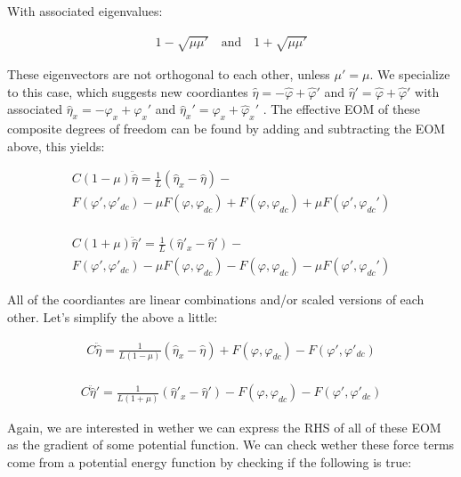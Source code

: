\documentclass[paper=a4, twocolumn, fontsize=10pt]{article} %
\numberwithin{equation}{section} %
\numberwithin{figure}{section} %
\numberwithin{table}{section} %
\def \df#1{\hat{#1}}
\def \dl#1{#1}
\begin{document}
 With associated eigenvalues:
 
 \begin{align} 1-\sqrt{\mu\mu'} \quad \text{and} \quad 1+\sqrt{\mu\mu'} \end{align} 
 
 
 
 These eigenvectors are not orthogonal to each other, unless $\mu'=\mu$. We specialize to this case, which suggests new coordiantes $\df\eta = -\df\varphi + \df\varphi'$ and $\df\eta' = \df\varphi+\df\varphi'$ with associated $\dl\df\eta_x = -\dl\varphi_x + \dl\varphi_x'$ and $\df\eta_x' = \df\varphi_x + \df\varphi_x'$ . The effective EOM of these composite degrees of freedom can be found by adding and subtracting the EOM above, this yields:

\begin{multline}
    C(1-\mu) \ddot{\df\eta} = \frac{1}{L} (\df\eta_x-\df\eta) - \\ F(\dl\varphi', \dl\varphi'_{dc}) - \mu F(\dl\varphi,\dl\varphi_{dc}) + F(\dl\varphi, \dl\varphi_{dc}) + \mu F(\dl\varphi',\dl\varphi_{dc}')
\end{multline}
    \\
\begin{multline}
    C(1+\mu) \ddot{\df\eta}' = \frac{1}{L} (\df\eta'_x-\df\eta') - \\ F(\dl\varphi', \dl\varphi'_{dc}) - \mu F(\dl\varphi,\dl\varphi_{dc}) - F(\dl\varphi, \dl\varphi_{dc}) - \mu F(\dl\varphi',\dl\varphi_{dc}')
\end{multline}

All of the coordiantes are linear combinations and/or scaled versions of each other. Let's simplify the above a little: 

\begin{multline}
    C \ddot{\df\eta} = \frac{1}{L(1-\mu)} (\df\eta_x-\df\eta) + F(\dl\varphi, \dl\varphi_{dc}) - F(\dl\varphi', \dl\varphi'_{dc})
\end{multline}
    \\
\begin{multline}
    C \ddot{\df\eta}' = \frac{1}{L(1+\mu)} (\df\eta'_x-\df\eta') - F(\dl\varphi, \dl\varphi_{dc}) - F(\dl\varphi', \dl\varphi'_{dc})
\end{multline}

Again, we are interested in wether we can express the RHS of all of these EOM as the gradient of some potential function. We can check wether these force terms come from a potential energy function by checking if the following is true:
\end{document}
